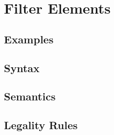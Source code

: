 %
\chapter{Filter Elements} \label{ch::arm::fe}

\section{Examples}%

\section{Syntax} %

\section{Semantics} %

\section{Legality Rules}

\faq{}
\comments{



%
%

}
